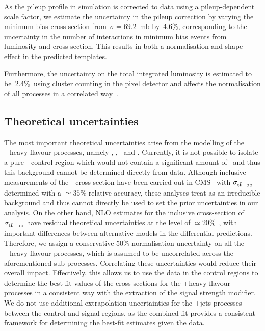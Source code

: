 As the pileup profile in simulation is corrected to data using a pileup-dependent scale factor, we estimate the uncertainty in the pileup correction by varying the minimum bias cross section from~$\sigma = 69.2$~mb by~$4.6\%$, corresponding to the uncertainty in the number of interactions in minimum bias events from luminosity and cross section\cite{CMS:2017_pu_weight_twiki}. This results in both a normalisation and shape effect in the predicted templates.

Furthermore, the uncertainty on the total integrated luminosity is estimated to be~$2.4\%$~using cluster counting in the pixel detector and affects the normalisation of all processes in a correlated way~\cite{CMS:2017sdi,CMS:2017_lumi}.

\subsection{Theoretical uncertainties}
\label{sec:theory_unc}
The most important theoretical uncertainties arise from the modelling of the \ttbar+heavy flavour processes, namely \ttbb, \tttwob, \ttb~and \ttcc. Currently, it is not possible to isolate a pure~\ttbb~control region which would not contain a significant amount of~\ttHbb\xspace and thus this background cannot be determined directly from data. Although inclusive measurements of the~\ttbb~cross-section have been carried out in CMS~\cite{Sirunyan:2017snr} with $\sigma_{\mathrm{t} \bar{\mathrm{t}} + \mathrm{b}\bar{\mathrm{b}}}$ determined with a $\simeq 35\%$ relative accuracy, these analyses treat \ttHbb\xspace as an irreducible background and thus cannot directly be used to set the prior uncertainties in our analysis. On the other hand, NLO estimates for the inclusive cross-section of $\sigma_{\mathrm{t} \bar{\mathrm{t}} + \mathrm{b}\bar{\mathrm{b}}}$ have residual theoretical uncertainties at the level of $\simeq 20\%$~\cite{Bredenstein:2010rs}, with important differences between alternative models in the differential predictions. Therefore, we assign a conservative 50\% normalisation uncertainty on all the \ttbar+heavy flavour processes, which is assumed to be uncorrelated across the aforementioned sub-processes. Correlating these uncertainties would reduce their overall impact. Effectively, this allows us to use the data in the control regions to determine the best fit values of the cross-sections for the \ttbar+heavy flavour processes in a consistent way with the extraction of the signal strength modifier. We do not use additional extrapolation uncertainties for the \ttbar+jets processes between the control and signal regions, as the combined fit provides a consistent framework for determining the best-fit estimates given the data.

